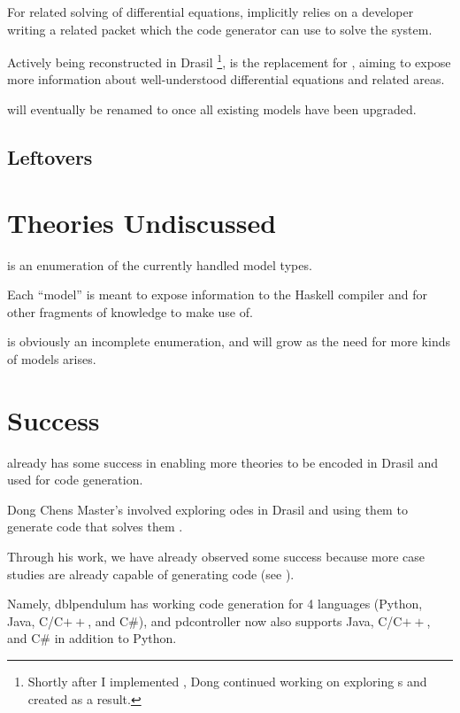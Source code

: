 For related solving of differential equations, \DEModel{} implicitly relies on a
developer writing a related \ODEInfo{} packet which
the code generator can use to solve the system.

Actively being reconstructed in Drasil \cite{Chen2022MEng} \footnote{Shortly
after I implemented \ModelKind{}, Dong continued working on exploring
\DEModel{}s and created \NewDEModel{} as a result.}, \NewDEModel{} is the
replacement for \DEModel{}, aiming to expose more information about
well-understood differential equations and related areas.

\NewDEModel{} will eventually be renamed to \DEModel{} once all existing
\DEModel{} models have been upgraded.


\subsection{Leftovers}


\section{Theories Undiscussed}

\ModelKinds{} is an enumeration of the currently handled model types.

Each ``model'' is meant to expose information to the Haskell compiler and for
other fragments of knowledge to make use of.

\ModelKinds{} is obviously an incomplete enumeration, and will grow as the need
for more kinds of models arises.













\section{Success}
\label{chap:more-theory-kinds:sec:success}

\ModelKind{} already has some success in enabling more theories to be encoded in
Drasil and used for code generation.

Dong Chens Master's involved exploring \acsp{ode} in Drasil and using them to
generate code that solves them \cite{Chen2022MEng}.

Through his work, we have already observed some success because more case
studies are already capable of generating code (see
).

Namely, \acs{dblpendulum} has working code generation for 4 languages (Python,
Java, C/C\(++\), and C\#), and \acs{pdcontroller} now also supports Java,
C/C\(++\), and C\# in addition to Python.

\caseStudiesCodeTableAfterDongsWork{}

